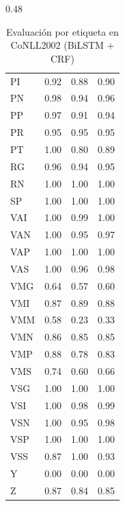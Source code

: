 \begin{table}[H]
\begin{subtable}{0.48\textwidth}
\begin{tabular}{lccc}
PI  & 0.92 & 0.88 & 0.90 \\
PN  & 0.98 & 0.94 & 0.96 \\
PP  & 0.97 & 0.91 & 0.94 \\
PR  & 0.95 & 0.95 & 0.95 \\
PT  & 1.00 & 0.80 & 0.89 \\
RG  & 0.96 & 0.94 & 0.95 \\
RN  & 1.00 & 1.00 & 1.00 \\
SP  & 1.00 & 1.00 & 1.00 \\
VAI & 1.00 & 0.99 & 1.00 \\
VAN & 1.00 & 0.95 & 0.97 \\
VAP & 1.00 & 1.00 & 1.00 \\
VAS & 1.00 & 0.96 & 0.98 \\
VMG & 0.64 & 0.57 & 0.60 \\
VMI & 0.87 & 0.89 & 0.88 \\
VMM & 0.58 & 0.23 & 0.33 \\
VMN & 0.86 & 0.85 & 0.85 \\
VMP & 0.88 & 0.78 & 0.83 \\
VMS & 0.74 & 0.60 & 0.66 \\
VSG & 1.00 & 1.00 & 1.00 \\
VSI & 1.00 & 0.98 & 0.99 \\
VSN & 1.00 & 0.95 & 0.98 \\
VSP & 1.00 & 1.00 & 1.00 \\
VSS & 0.87 & 1.00 & 0.93 \\
Y   & 0.00 & 0.00 & 0.00 \\
Z   & 0.87 & 0.84 & 0.85 \\
\hline
\end{tabular}
\caption{Part 2}
\end{subtable}

\caption{Evaluación por etiqueta en CoNLL2002 (BiLSTM + CRF)}
\end{table}
